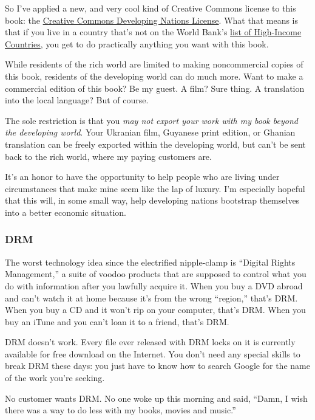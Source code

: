 \documentclass{article}
\begin{document}
So I've applied a new, and very cool kind of Creative Commons license
to this book:  the 
\href{http://creativecommons.org/licenses/devnations/2.0/}{Creative
Commons Developing Nations License}.  What that means is that if
you live in a country that's not on the World Bank's
\href{http://rru.worldbank.org/DoingBusiness/ExploreEconomies/EconomyCharacteristics.aspx}{list
of High-Income Countries}, you get to do practically anything you
want with this book.

While residents of the rich world are limited to making noncommercial
copies of this book, residents of the developing world can do much
more.  Want to make a commercial edition of this book?  Be my guest. 
A film?  Sure thing.  A translation into the local language?  But of
course.

The sole restriction is that you \textit{may not export your work with
my book beyond the developing world}.  Your Ukranian film, Guyanese
print edition, or Ghanian translation can be freely exported within
the developing world, but can't be sent back to the rich world, where
my paying customers are. 

It's an honor to have the opportunity to help people who are living
under circumstances that make mine seem like the lap of luxury.  I'm
especially hopeful that this will, in some small way, help developing
nations bootstrap themselves into a better economic situation.


\subsubsection{DRM}

The worst technology idea since the electrified nipple-clamp is
``Digital Rights Management,'' a suite of voodoo products that are
supposed to control what you do with information after you lawfully
acquire it.  When you buy a DVD abroad and can't watch it at home
because it's from the wrong ``region,'' that's DRM.  When you buy a CD
and it won't rip on your computer, that's DRM.  When you buy an iTune
and you can't loan it to a friend, that's DRM.

DRM doesn't work.  Every file ever released with DRM locks on it is
currently available for free download on the Internet.  You don't need
any special skills to break DRM these days:  you just have to know how
to search Google for the name of the work you're seeking.

No customer wants DRM.  No one woke up this morning and said, ``Damn,
I wish there was a way to do less with my books, movies and music.''
\end{document}
